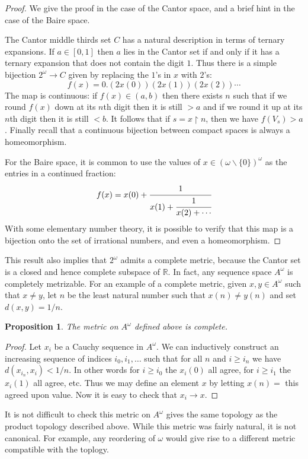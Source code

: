 \documentclass[11pt,oneside]{amsbook}
\newcommand{\R}{\mathbb R}
\theoremstyle{definition}
\theoremstyle{plain}
\newtheorem{proposition}[theorem]{Proposition}
\theoremstyle{definition}
\theoremstyle{remark}
\numberwithin{equation}{section}
\numberwithin{figure}{section}
\begin{document}
\begin{proof}
  We give the proof in the case of the Cantor space, and a brief hint in the case of the Baire space.

  The Cantor middle thirds set $C$ has a natural description in terms of ternary expansions. If $a\in[0,1]$ then $a$ lies in the Cantor set if and only if it has a ternary expansion that does not contain the digit $1$. Thus there is a simple bijection $2^\omega\to C$ given by replacing the $1$'s in $x$ with $2$'s:
\[f(x)=0.(2x(0))(2x(1))(2x(2))\cdots
\]
The map is continuous: if $f(x)\in(a,b)$ then there exists $n$ such that if we round $f(x)$ down at its $n$th digit then it is still $>a$ and if we round it up at its $n$th digit then it is still $<b$. It follows that if $s=x\restriction n$, then we have $f(V_s)>a$. Finally recall that a continuous bijection between compact spaces is always a homeomorphism.

  For the Baire space, it is common to use the values of $x\in(\omega\smallsetminus\{0\})^\omega$ as the entries in a continued fraction:
\[f(x)=x(0)+\cfrac{1}{x(1)+\cfrac{1}{x(2)+\cdots}}
\]
With some elementary number theory, it is possible to verify that this map is a bijection onto the set of irrational numbers, and even a homeomorphism.
\end{proof}

This result also implies that $2^\omega$ admits a complete metric, because the Cantor set is a closed and hence complete subspace of $\R$. In fact, any sequence space $A^\omega$ is completely metrizable. For an example of a complete metric, given $x,y\in A^\omega$ such that $x\neq y$, let $n$ be the least natural number such that $x(n)\neq y(n)$ and set $d(x,y)=1/n$.

\begin{proposition}
  The metric on $A^\omega$ defined above is complete.
\end{proposition}

\begin{proof}
  Let $x_i$ be a Cauchy sequence in $A^\omega$. We can inductively construct an increasing sequence of indices $i_0,i_1,\ldots$ such that for all $n$ and $i\geq i_n$ we have $d(x_{i_n},x_i)<1/n$. In other words for $i\geq i_0$ the $x_i(0)$ all agree, for $i\geq i_1$ the $x_i(1)$ all agree, etc. Thus we may define an element $x$ by letting $x(n)=$ this agreed upon value. Now it is easy to check that $x_i\to x$.
\end{proof}

It is not difficult to check this metric on $A^\omega$ gives the same topology as the product topology described above. While this metric was fairly natural, it is not canonical. For example, any reordering of $\omega$ would give rise to a different metric compatible with the toplogy.
\end{document}
